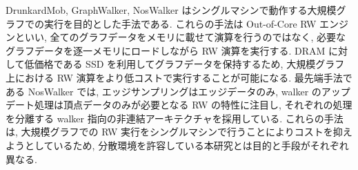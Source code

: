 DrunkardMob\cite{10.1145/2507157.2507173}, GraphWalker\cite{254449}, NosWalker\cite{10.1145/3582016.3582025} はシングルマシンで動作する大規模グラフでの実行を目的とした手法である. これらの手法は Out-of-Core RW エンジンといい, 全てのグラフデータをメモリに載せて演算を行うのではなく, 必要なグラフデータを逐一メモリにロードしながら RW 演算を実行する. DRAM に対して低価格である SSD を利用してグラフデータを保持するため, 大規模グラフ上における RW 演算をより低コストで実行することが可能になる. 最先端手法である NosWalker では, エッジサンプリングはエッジデータのみ, walker のアップデート処理は頂点データのみが必要となる RW の特性に注目し, それぞれの処理を分離する walker 指向の非連結アーキテクチャを採用している. これらの手法は, 大規模グラフでの RW 実行をシングルマシンで行うことによりコストを抑えようとしているため, 分散環境を許容している本研究とは目的と手段がそれぞれ異なる.

